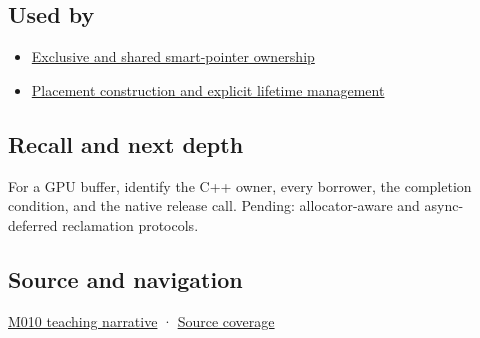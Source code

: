 \subsection{Used by}\label{appendix-69739d3ab49b-used-by}

\begin{itemize}
\tightlist
\item
  \hyperref[appendix-51602cabe815]{Exclusive and shared smart-pointer ownership}
\item
  \hyperref[appendix-f56c3e43fd4e]{Placement construction and explicit lifetime management}
\end{itemize}

\subsection{Recall and next depth}\label{appendix-69739d3ab49b-recall-and-next-depth}

For a GPU buffer, identify the C++ owner, every borrower, the completion condition, and the native release call. Pending: allocator-aware and async-deferred reclamation protocols.

\subsection{Source and navigation}\label{appendix-69739d3ab49b-source-and-navigation}

\hyperref[01-foundations-i-ch004-from-a-live-object-to-responsible-resource-ownership]{M010 teaching narrative} · \hyperref[appendix-fd090d982a15-m010---parts-148-160]{Source coverage}
